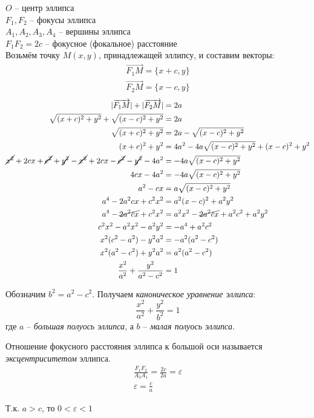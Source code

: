 $O$ -- центр эллипса \\
 $F_1, F_2$ -- фокусы эллипса \\
 $A_1, A_2, A_3, A_4$ -- вершины эллипса \\
$F_1F_2 = 2c$  -- фокусное (фокальное) расстояние\\
Возьмём точку $M(x, y)$, принадлежащей эллипсу, и составим векторы:
\begin{gather*}
  \overrightarrow{F_1M} = \{x + c, y\} \\
  \overrightarrow{F_2M} = \{x - c, y\}
\end{gather*}
\begin{align*}
  |\overrightarrow{F_1M}| + |\overrightarrow{F_2M}| &= 2a \\
  \sqrt{(x + c)^2 + y^2} + \sqrt{(x - c)^2 + y^2} &= 2a \\
  \sqrt{(x + c)^2 + y^2} &= 2a - \sqrt{(x - c)^2 + y^2} \\
  (x + c)^2 + y^2 &= 4a^2 - 4a\sqrt{(x - c)^2 + y^2} + (x - c)^2 +y^2 \\
  \cancel{x^2} + 2cx + \cancel{c^2} + \cancel{y^2} - \cancel{x^2} + 2cx - \cancel{c^2} - \cancel{y^2} - 4a^2 &= -4a\sqrt{(x - c)^2 + y^2} \\
  4cx - 4a^2 &= -4a\sqrt{(x - c)^2 + y^2} \\
  a^2 - cx &= a\sqrt{(x - c)^2 + y^2} \\
  a^4 - 2a^2cx + c^2x^2 &= a^2(x - c)^2 + a^2y^2 \\
  a^4 - \cancel{2a^2cx} + c^2x^2 &= a^2x^2 - \cancel{2a^2cx} + a^2c^2 + a^2y^2 \\
  c^2x^2 - a^2x^2 - a^2y^2 &= - a^4 + a^2c^2 \\
  x^2(c^2 - a^2) - y^2a^2 &= -a^2(a^2 - c^2) \\
  x^2(a^2 - c^2) + y^2a^2 &= a^2(a^2 - c^2) \\
  \frac{x^2}{a^2} + \frac{y^2}{a^2 - c^2} &= 1
\end{align*} 

Обозначим $b^2 = a^2 - c^2$. Получаем \textit{каноническое уравнение эллипса}: \[
  \boxed{\frac{x^2}{a^2} + \frac{y^2}{b^2} = 1}
\]  
где $a$ -- \textit{большая полуось эллипса}, а  $b$ -- \textit{малая полуось эллипса}.

Отношение фокусного расстояния эллипса к большой оси называется \textit{эксцентриситетом} эллипса.
\begin{gather*}
  \frac{F_1F_2}{A_3A_1} = \frac{2c}{2a} = \varepsilon \\
  \boxed{\varepsilon = \frac{c}{a}}
\end{gather*}
\begin{note}
  Т.к. $a > c$, то $0 < \varepsilon < 1$
\end{note}

